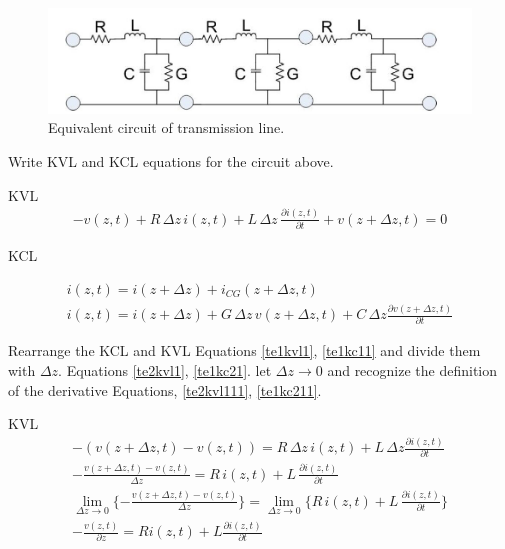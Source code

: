\documentclass{ximera}
\begin{document}
\begin{figure}[htbp]
\begin{center}
\includegraphics[scale=0.4]{../jpg/tlmadeupofcircuits.jpg}
\end{center}
\caption{Equivalent circuit of transmission line.}
\label{lineeqc}
\end{figure}



Write  KVL and KCL equations for the circuit above.

KVL
\begin{eqnarray}
-v(z,t) + R \, \Delta z \, i(z,t) + L \,\Delta z \,\frac{\partial
 i(z,t)}{\partial t} + v(z+ \Delta z,t) = 0 \nonumber
\end{eqnarray}

KCL

\begin{eqnarray}
i(z,t)=i(z+\Delta z)+ i_{CG}(z+\Delta z,t) \nonumber   \\
i(z,t)=i(z+\Delta z)+ G \, \Delta z\, v(z+\Delta z,t)+C\, \Delta z
\frac{\partial v(z+\Delta z,t)}{\partial t} \nonumber
\end{eqnarray}


Rearrange the KCL and KVL Equations \ref{te1kvl1}, \ref{te1kc11} and divide them with
$\Delta z$.  Equations \ref{te2kvl1}, \ref{te1kc21}.
let $\Delta z \to 0$ and recognize the definition of the
derivative Equations, \ref{te2kvl111}, \ref{te1kc211}.

KVL
\begin{eqnarray}
-( v(z+ \Delta z ,t)- v(z,t))=R \, \Delta z  \, i(z,t)+L  \,  \Delta z
 \frac{\partial i(z,t)}{\partial t} \label{te1kvl1}  \\ 
 -\frac{ v(z+ \Delta z ,t)- v(z,t)}{\Delta z}=R  \, i(z,t)+L  \, 
 \frac{\partial i(z,t)}{\partial t}  \label{te2kvl1} \\
\lim_{\Delta z \to 0} \{ -\frac{ v(z+ \Delta z ,t)- v(z,t)}{\Delta z}\}=  \lim_{\Delta z \to 0} \{   R  \,  i(z,t)+L  \, 
 \frac{\partial i(z,t)}{\partial t} \} \label{te2kvl111} \\
-\frac{v(z,t) }{\partial z}=R i(z,t)+L 
 \frac{\partial i(z,t)}{\partial t} \label{te3kvl1}
\end{eqnarray}
\end{document}
